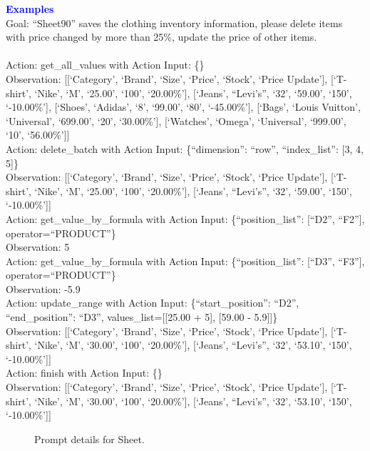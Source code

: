 \begin{tcolorbox}[breakable,title=Prompt Details for Sheet]
\textbf{\textcolor{blue}{Examples}}\\
Goal: ``Sheet90'' saves the clothing inventory information, please delete items with price changed by more than 25\%, update the price of other items.\\
\\
Action: get\_all\_values with Action Input: \{\}\\
Observation: [[`Category', `Brand', `Size', `Price', `Stock', `Price Update'], [`T-shirt', `Nike', `M', `25.00', `100', `20.00\%'], [`Jeans', ``Levi's'', `32', `59.00', `150', `-10.00\%'], [`Shoes', `Adidas', `8', `99.00', `80', `-45.00\%'], [`Bags', `Louis Vuitton', `Universal', `699.00', `20', `30.00\%'], [`Watches', `Omega', `Universal', `999.00', `10', `56.00\%']]\\
Action: delete\_batch with Action Input: \{``dimension'': ``row'', ``index\_list'': [3, 4, 5]\}\\
Observation: [[`Category', `Brand', `Size', `Price', `Stock', `Price Update'], [`T-shirt', `Nike', `M', `25.00', `100', `20.00\%'], [`Jeans', ``Levi's'', `32', `59.00', `150', `-10.00\%']]\\
Action: get\_value\_by\_formula with Action Input: \{``position\_list'': [``D2'', ``F2''], operator=``PRODUCT''\}\\
Observation: 5\\
Action: get\_value\_by\_formula with Action Input: \{``position\_list'': [``D3'', ``F3''], operator=``PRODUCT''\}\\
Observation: -5.9\\
Action: update\_range with Action Input: \{``start\_position'': ``D2'', ``end\_position'': ``D3'', values\_list=[[25.00 + 5], [59.00 - 5.9]]\}\\
Observation: [[`Category', `Brand', `Size', `Price', `Stock', `Price Update'], [`T-shirt', `Nike', `M', `30.00', `100', `20.00\%'], [`Jeans', ``Levi's'', `32', `53.10', `150', `-10.00\%']]\\
Action: finish with Action Input: \{\}\\
Observation: [[`Category', `Brand', `Size', `Price', `Stock', `Price Update'], [`T-shirt', `Nike', `M', `30.00', `100', `20.00\%'], [`Jeans', ``Levi's'', `32', `53.10', `150', `-10.00\%']]\\

\end{tcolorbox}
\begin{figure}[!h]
    \vspace{-0.08cm}
    \caption{Prompt details for Sheet.}
    \label{fig:sheet_prompt}
\end{figure}